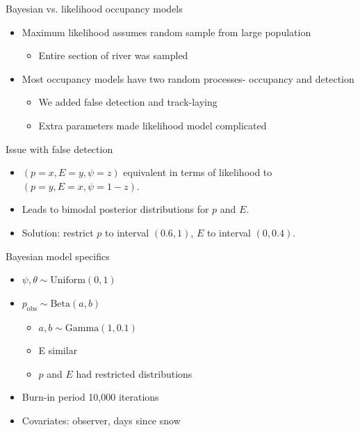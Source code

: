\documentclass{beamer}
\begin{document}
\begin{frame}{Bayesian vs. likelihood occupancy models}
	\begin{itemize}
		\item Maximum likelihood assumes random sample from large population
		\begin{itemize}
			\item Entire section of river was sampled
		\end{itemize}
		\item Most occupancy models have two random processes- occupancy and 
		detection
		\begin{itemize}
			\item We added false detection and track-laying
			\item Extra parameters made likelihood model complicated
		\end{itemize}
	\end{itemize}
\end{frame}

\begin{frame}{Issue with false detection}
	\begin{itemize}
		\item $(p=x, E=y, \psi=z)$ equivalent in terms of likelihood to 
		$(p=y,E=x,\psi=1-z)$.
		\item Leads to bimodal posterior distributions for $p$ and $E$.
		\item Solution: restrict $p$ to interval $(0.6,1)$, $E$ to interval 
		$(0,0.4)$.
	\end{itemize}
\end{frame}

\begin{frame}{Bayesian model specifics}
	\begin{itemize}
		\item $\psi,\theta \sim \text{Uniform}(0,1)$
		\item $p_{\text{obs}} \sim \text{Beta}(a,b)$
		\begin{itemize}
			\item $a, b \sim \text{Gamma}(1,0.1)$
			\item E similar
			\item $p$ and $E$ had restricted distributions
		\end{itemize}
		\item Burn-in period 10,000 iterations
		\item Covariates: observer, days since snow
	\end{itemize}
\end{frame}
\end{document}
